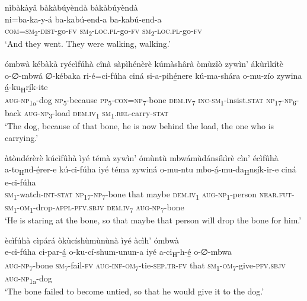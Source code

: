 nìbàkàyâ bàkàbúyèndà bàkàbúyèndà \\
\gll ni=ba-ka-y-á      ba-kabú-end-a  ba-kabú-end-a\\
\textsc{com}=\textsc{sm}\textsubscript{2}{}-\textsc{dist}{}-go-\textsc{fv}  \textsc{sm}\textsubscript{2}{}-\textsc{loc}.\textsc{pl}{}-go-\textsc{fv}  \textsc{sm}\textsubscript{2}{}-\textsc{loc}.\textsc{pl}{}-go-\textsc{fv}\\
\glt ‘And they went. They were walking, walking.’\bigskip

ómbwà kébàkà ryécìfúhà cînà sàpìhénèrè kúmàshârà òmùzîò zywìn’ ákùrìkítè\\
\gll o-∅-mbwá    ∅-kébaka  ri-é=ci-fúha    ciná      si-a-pihé̲nere   kú-ma-shára    o-mu-zío zywina  á̲-ku\textsubscript{H}rí̲k-ite \\
\textsc{aug}{}-\textsc{np}\textsubscript{1a}{}-dog  \textsc{np}\textsubscript{5}{}-because  \textsc{pp}\textsubscript{5}{}-\textsc{con}=\textsc{np}\textsubscript{7}{}-bone  \textsc{dem}.\textsc{iv}\textsubscript{7}
\textsc{inc}{}-\textsc{sm}\textsubscript{1}{}-insist.\textsc{stat}  \textsc{np}\textsubscript{17}{}-\textsc{np}\textsubscript{6}{}-back  \textsc{aug}{}-\textsc{np}\textsubscript{3}{}-load
\textsc{dem}.\textsc{iv}\textsubscript{1}  \textsc{sm}\textsubscript{1}.\textsc{rel}{}-carry-\textsc{stat}\\
\glt ‘The dog, because of that bone, he is now behind the load, the one who is carrying.’\bigskip

àtòndérèrè kúcìfûhà ìyé témà zywìn’ ómùntù mbwámùdánsíkìrè cìn’ écìfûhà\\
\gll a-to\textsubscript{H}nd-é̲rer-e    kú-ci-fúha    iyé  téma    zywiná o-mu-ntu     mbo-á̲-mu-da\textsubscript{H}nsí̲k-ir-e ciná    e-ci-fúha\\
\textsc{sm}\textsubscript{1}{}-watch-\textsc{int}{}-\textsc{stat}  \textsc{np}\textsubscript{17}{}-\textsc{np}\textsubscript{7}{}-bone  that  maybe    \textsc{dem}.\textsc{iv}\textsubscript{1}
\textsc{aug}{}-\textsc{np}\textsubscript{1}{}-person   \textsc{near}.\textsc{fut}{}-\textsc{sm}\textsubscript{1}{}-\textsc{om}\textsubscript{1}{}-drop-\textsc{appl}{}-\textsc{pfv}.\textsc{sbjv}
\textsc{dem}.\textsc{iv}\textsubscript{7} \textsc{aug}{}-\textsc{np}\textsubscript{7}{}-bone \\
\glt ‘He is staring at the bone, so that maybe that person will drop the bone for him.’\bigskip

ècìfúhà cìpárá òkùcíshùmùnùnà ìyé àcìh’ ómbwà\\
\gll e-ci-fúha    ci-par-á̲  o-ku-cí-shum-unun-a iyé  a-ci\textsubscript{H}{}-h-é̲      o-∅-mbwa \\
\textsc{aug}{}-\textsc{np}\textsubscript{7}{}-bone  \textsc{sm}\textsubscript{7}{}-fail-\textsc{fv}  \textsc{aug}{}-\textsc{inf}{}-\textsc{om}\textsubscript{7}{}-tie-\textsc{sep}.\textsc{tr}{}-\textsc{fv}
that  \textsc{sm}\textsubscript{1}{}-\textsc{om}\textsubscript{7}{}-give-\textsc{pfv}.\textsc{sbjv}  \textsc{aug}{}-\textsc{np}\textsubscript{1a}{}-dog\\
\glt ‘The bone failed to become untied, so that he would give it to the dog.’\bigskip

